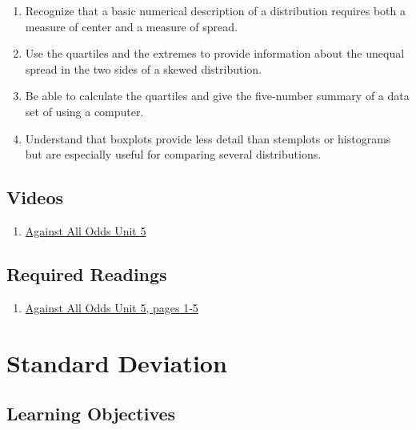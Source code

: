 \documentclass[letterpaper,9pt,twocolumn,twoside,printwatermark=false]{pinp}
\providecommand{\tightlist}{%
  \setlength{\itemsep}{0pt}\setlength{\parskip}{0pt}}
\begin{document}
\begin{enumerate}
\def\labelenumi{\arabic{enumi}.}
\tightlist
\item
  Recognize that a basic numerical description of a distribution
  requires both a measure of center and a measure of spread.
\item
  Use the quartiles and the extremes to provide information about the
  unequal spread in the two sides of a skewed distribution.
\item
  Be able to calculate the quartiles and give the five-number summary of
  a data set of using a computer.
\item
  Understand that boxplots provide less detail than stemplots or
  histograms but are especially useful for comparing several
  distributions.
\end{enumerate}

\hypertarget{videos}{%
\subsection{Videos}\label{videos}}

\begin{enumerate}
\def\labelenumi{\arabic{enumi}.}
\tightlist
\item
  \href{https://www.learner.org/courses/againstallodds/unitpages/unit05.html}{Against
  All Odds Unit 5}
\end{enumerate}

\hypertarget{required-readings}{%
\subsection{Required Readings}\label{required-readings}}

\begin{enumerate}
\def\labelenumi{\arabic{enumi}.}
\tightlist
\item
  \href{https://www.learner.org/courses/againstallodds/pdfs/AgainstAllOdds_StudentGuide_Unit03.pdf\#page=1}{Against
  All Odds Unit 5, pages 1-5}
\end{enumerate}

\vspace*{0.25cm}

\hypertarget{standard-deviation}{%
\section{Standard Deviation}\label{standard-deviation}}

\hypertarget{learning-objectives-1}{%
\subsection{Learning Objectives}\label{learning-objectives-1}}
\end{document}
